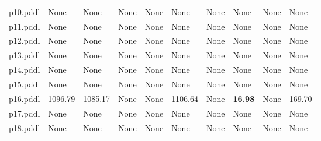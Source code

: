 \documentclass{article}
\begin{document}
\begin{tabular}{@{}lrrrrrrrrr@{}}
p10.pddl & \multicolumn{1}{|l|}{None} & \multicolumn{1}{|l|}{None} & \multicolumn{1}{|l|}{None} & \multicolumn{1}{|l|}{None} & \multicolumn{1}{|l|}{None} & \multicolumn{1}{|l|}{None} & \multicolumn{1}{|l|}{None} & \multicolumn{1}{|l|}{None} & \multicolumn{1}{|l|}{None} \\
p11.pddl & \multicolumn{1}{|l|}{None} & \multicolumn{1}{|l|}{None} & \multicolumn{1}{|l|}{None} & \multicolumn{1}{|l|}{None} & \multicolumn{1}{|l|}{None} & \multicolumn{1}{|l|}{None} & \multicolumn{1}{|l|}{None} & \multicolumn{1}{|l|}{None} & \multicolumn{1}{|l|}{None} \\
p12.pddl & \multicolumn{1}{|l|}{None} & \multicolumn{1}{|l|}{None} & \multicolumn{1}{|l|}{None} & \multicolumn{1}{|l|}{None} & \multicolumn{1}{|l|}{None} & \multicolumn{1}{|l|}{None} & \multicolumn{1}{|l|}{None} & \multicolumn{1}{|l|}{None} & \multicolumn{1}{|l|}{None} \\
p13.pddl & \multicolumn{1}{|l|}{None} & \multicolumn{1}{|l|}{None} & \multicolumn{1}{|l|}{None} & \multicolumn{1}{|l|}{None} & \multicolumn{1}{|l|}{None} & \multicolumn{1}{|l|}{None} & \multicolumn{1}{|l|}{None} & \multicolumn{1}{|l|}{None} & \multicolumn{1}{|l|}{None} \\
p14.pddl & \multicolumn{1}{|l|}{None} & \multicolumn{1}{|l|}{None} & \multicolumn{1}{|l|}{None} & \multicolumn{1}{|l|}{None} & \multicolumn{1}{|l|}{None} & \multicolumn{1}{|l|}{None} & \multicolumn{1}{|l|}{None} & \multicolumn{1}{|l|}{None} & \multicolumn{1}{|l|}{None} \\
p15.pddl & \multicolumn{1}{|l|}{None} & \multicolumn{1}{|l|}{None} & \multicolumn{1}{|l|}{None} & \multicolumn{1}{|l|}{None} & \multicolumn{1}{|l|}{None} & \multicolumn{1}{|l|}{None} & \multicolumn{1}{|l|}{None} & \multicolumn{1}{|l|}{None} & \multicolumn{1}{|l|}{None} \\
p16.pddl & 1096.79 & 1085.17 & \multicolumn{1}{|l|}{None} & \multicolumn{1}{|l|}{None} & 1106.64 & \multicolumn{1}{|l|}{None} & \textbf{16.98} & \multicolumn{1}{|l|}{None} & 169.70 \\
p17.pddl & \multicolumn{1}{|l|}{None} & \multicolumn{1}{|l|}{None} & \multicolumn{1}{|l|}{None} & \multicolumn{1}{|l|}{None} & \multicolumn{1}{|l|}{None} & \multicolumn{1}{|l|}{None} & \multicolumn{1}{|l|}{None} & \multicolumn{1}{|l|}{None} & \multicolumn{1}{|l|}{None} \\
p18.pddl & \multicolumn{1}{|l|}{None} & \multicolumn{1}{|l|}{None} & \multicolumn{1}{|l|}{None} & \multicolumn{1}{|l|}{None} & \multicolumn{1}{|l|}{None} & \multicolumn{1}{|l|}{None} & \multicolumn{1}{|l|}{None} & \multicolumn{1}{|l|}{None} & \multicolumn{1}{|l|}{None} \\

\end{tabular}
\end{document}
